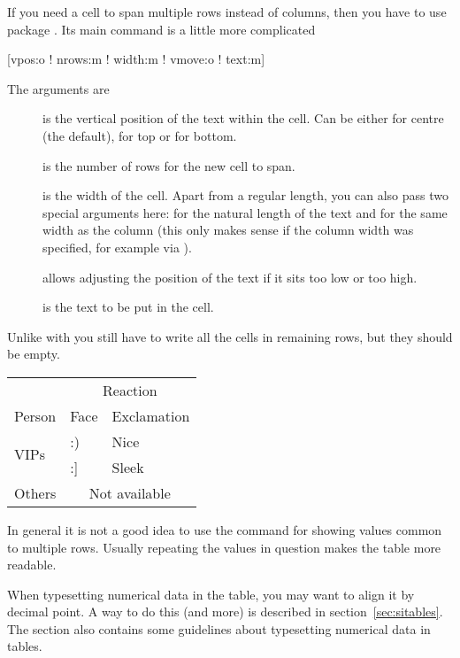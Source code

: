If you need a cell to span multiple rows instead of columns, then you have to
use package . Its main command is a little more complicated
\begin{lscommand}
  [vpos:o ! nrows:m ! width:m ! vmove:o ! text:m]
\end{lscommand}
The arguments are
\begin{description}
  \item[] is the vertical position of the text within the cell.
    Can be either  for centre (the default),  for top or
     for bottom.
  \item[] is the number of rows for the new cell to span.
  \item[] is the width of the cell. Apart from a regular length,
    you can also pass two special arguments here: \cargv{*} for the natural
    length of the text and \cargv{=} for the same width as the column (this
    only makes sense if the column width was specified, for example via
    ).
  \item[] allows adjusting the position of the text if it sits too
    low or too high.
  \item[] is the text to be put in the cell.
\end{description}
Unlike with  you still have to write all the cells in remaining
rows, but they should be empty.
\begin{example}[examplewidth=0.4\linewidth]
\begin{tabular}{@{}lll@{}}
  \toprule
                & \multicolumn{2}{c}{
                    Reaction}        \\
  \cmidrule(l){2-3}
  Person        & Face & Exclamation \\
  \midrule
  \multirow[t]{
    2}{*}{VIPs} & :)   & Nice        \\
                & :]   & Sleek       \\
  Others        & \multicolumn{2}{c}{
                    Not available}   \\
  \bottomrule
\end{tabular}
\end{example}
In general it is not a good idea to use the  command for showing
values common to multiple rows. Usually repeating the values in question makes
the table more readable.

When typesetting numerical data in the table, you may want to align it by
decimal point. A way to do this (and more) is described in
section~\ref{sec:sitables}. The section also contains some guidelines about
typesetting numerical data in tables.

